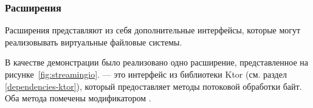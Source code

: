 %
%
%


  \subsubsection{Расширения}
    Расширения представляют из себя дополнительные интерфейсы, которые могут реализовывать виртуальные файловые системы.

    В качестве демонстрации было реализовано одно расширение, представленное на рисунке~\ref{fig:streamingio}.  --- это интерфейс из библиотеки Ktor (см. раздел \ref{dependencies-ktor}), который предоставляет методы потоковой обработки байт. Оба метода помечены модификатором .
    
